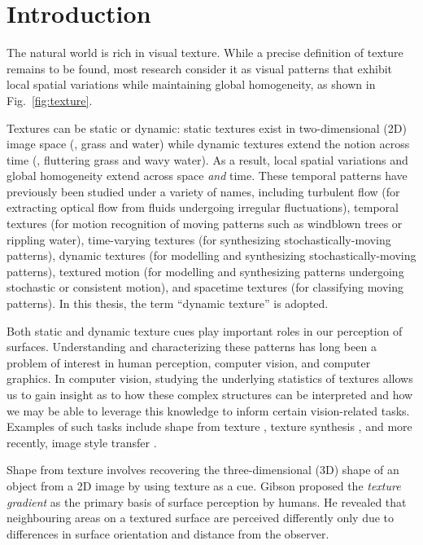 \chapter{Introduction}

The natural world is rich in visual texture. While a precise definition of 
texture remains to be found, most research consider it as visual patterns that 
exhibit local spatial variations while maintaining global homogeneity, as shown in Fig.\ \ref{fig:texture}.



Textures 
can be static or dynamic: static textures exist in two-dimensional (2D) image space 
(\eg, grass and water) while dynamic textures extend the notion across time (\eg, 
fluttering grass and wavy water). As a result, local spatial variations and 
global homogeneity extend across space \emph{and} time. These temporal patterns 
have previously been studied under a variety of names, including turbulent flow \cite{heeger1986} (for extracting optical flow from fluids undergoing irregular fluctuations), temporal textures \cite{nelson1992} (for motion recognition of moving patterns such as windblown trees or rippling water), time-varying 
textures \cite{bar-joseph2001} (for synthesizing stochastically-moving patterns), dynamic textures \cite{doretto2003} (for modelling and synthesizing stochastically-moving patterns), textured 
motion \cite{wang2003} (for modelling and synthesizing patterns undergoing stochastic or consistent motion), and spacetime textures \cite{derpanis2012spacetime} (for classifying moving patterns).
In this thesis, the term ``dynamic texture'' is adopted.

Both static and dynamic texture cues play important roles in our perception of 
surfaces. Understanding and characterizing these patterns has long been a problem 
of interest in human perception, computer vision, and computer graphics. In 
computer vision, studying the underlying statistics of textures allows us to gain 
insight as to how these complex structures can be interpreted and how we may be 
able to leverage this knowledge to inform certain vision-related tasks. Examples 
of such tasks include shape from texture \cite{gibson1950perception}, texture 
synthesis \cite{heeger1995pyramid}, and more recently, image style transfer 
\cite{gatys2016image}.

Shape from texture involves recovering the
three-dimensional (3D) shape of an object from a 2D image by using texture as a 
cue. Gibson \cite{gibson1950perception} proposed the \emph{texture gradient} as 
the primary basis of surface perception by humans. He revealed that neighbouring areas on a textured surface are perceived differently only due to differences
in surface orientation and distance from the observer.

